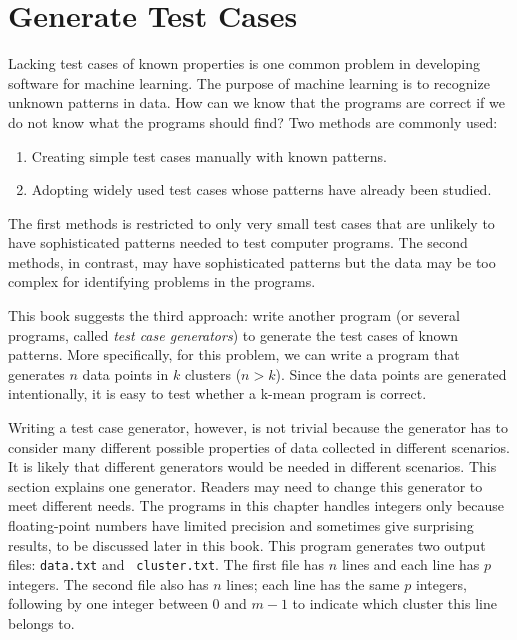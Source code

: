 \section{Generate Test Cases}

Lacking test cases of known properties is one common problem in
developing software for machine learning.  The purpose of machine
learning is to recognize unknown patterns in data.  How can we know
that the programs are correct if we do not know what the programs
should find?
Two methods are commonly used:
\begin{enumerate}
\item Creating simple test cases manually with known patterns.

\item Adopting widely used test cases whose patterns have already
  been studied.
\end{enumerate}
The first methods is restricted to only very small test cases that are
unlikely to have sophisticated patterns needed to test computer
programs.  The second methods, in contrast, may have sophisticated
patterns but the data may be too complex for identifying problems in
the programs.



This book suggests the third approach: write another program (or
several programs, called {\it test case generators}) to generate the
test cases of known patterns.  More specifically, for this problem, we
can write a program that generates $n$ data points in $k$ clusters ($n
> k$).  Since the data points are generated intentionally, it is easy
to test whether a k-mean program is correct.


Writing a test case generator, however, is not trivial because the
generator has to consider many different possible properties of data
collected in different scenarios. It is likely that different
generators would be needed in different scenarios. This section
explains one generator. Readers may need to change this generator to
meet different needs.  The programs in this chapter handles integers
only because floating-point numbers have limited precision and
sometimes give surprising results, to be discussed later in this book.
This program generates two output files: {\tt data.txt} and {\tt
  cluster.txt}.  The first file has $n$ lines and each line has $p$
integers.  The second file also has $n$ lines; each line has the same
$p$ integers, following by one integer between $0$ and $m - 1$ to
indicate which cluster this line belongs to.

